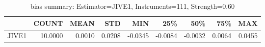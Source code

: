 \begin{table}[ht]
\centering
\caption{bias summary: Estimator=JIVE1, Instruments=111, Strength=0.60}
\begin{tabular}{lrrrrrrrr}
\toprule
 & COUNT & MEAN & STD & MIN & 25\% & 50\% & 75\% & MAX \\
\midrule
JIVE1 & 10.0000 & 0.0010 & 0.0208 & -0.0345 & -0.0084 & -0.0032 & 0.0064 & 0.0455 \\
\bottomrule
\end{tabular}
\end{table}
